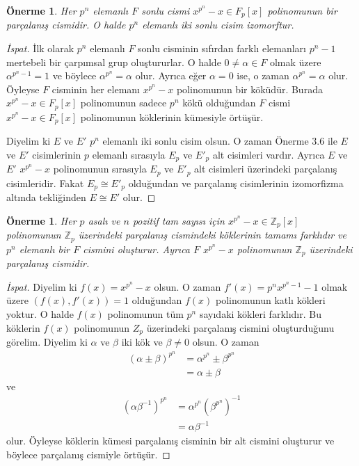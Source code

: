 \documentclass[draft]{article}
\newtheorem{prop}[thm]{Önerme}
\theoremstyle{definition}
\theoremstyle{remark}
\begin{document}
    	    \begin{prop}
    	        Her $p^n$ elemanlı $F$ sonlu cismi $x^{p^n} - x \in F_p[x]$ polinomunun bir parçalanış cismidir. O halde $p^n$ elemanlı iki sonlu cisim izomorftur.
    	    \end{prop}
    	    
    	    \begin{proof}[İspat]
    	        İlk olarak $p^n$ elemanlı $F$ sonlu cisminin sıfırdan farklı elemanları $p^n - 1$ mertebeli bir çarpımsal grup oluştururlar. O halde $0 \neq \alpha \in F$ olmak üzere $\alpha^{p^n - 1} = 1$ ve böylece $\alpha^{p^n} = \alpha$ olur. Ayrıca eğer $\alpha = 0$ ise, o zaman $\alpha^{p^n} = \alpha$ olur. Öyleyse $F$ cisminin her elemanı $x^{p^n} - x$ polinomunun bir köküdür. Burada $x^{p^n} - x \in F_p[x]$ polinomunun sadece $p^n$ kökü olduğundan $F$ cismi $x^{p^n} - x \in F_p[x]$ polinomunun köklerinin kümesiyle örtüşür.\par
    	        Diyelim ki $E$ ve $E'$ $p^n$ elemanlı iki sonlu cisim olsun. O zaman Önerme 3.6 ile $E$ ve $E'$ cisimlerinin $p$ elemanlı sırasıyla $E_p$ ve $E'_p$ alt cisimleri vardır. Ayrıca $E$ ve $E'$ $x^{p^n} - x$ polinomunun sırasıyla $E_p$ ve $E'_p$ alt cisimleri üzerindeki parçalanış cisimleridir. Fakat $E_p \cong E'_p$ olduğundan ve parçalanış cisimlerinin izomorfizma altında tekliğinden $E \cong E'$ olur.
    	    \end{proof}
    	    
    	    \begin{prop}
    	        Her $p$ asalı ve $n$ pozitif tam sayısı için $x^{p^n} - x \in \mathbb{Z}_p[x]$ polinomunun $\mathbb{Z}_p$ üzerindeki parçalanış cismindeki köklerinin tamamı farklıdır ve $p^n$ elemanlı bir $F$ cismini oluşturur. Ayrıca $F$ $x^{p^n} - x$ polinomunun $\mathbb{Z}_p$ üzerindeki parçalanış cismidir.
    	    \end{prop}
    	    
    	    \begin{proof}[İspat]
    	        Diyelim ki $f(x) = x^{p^n} - x$ olsun. O zaman $f'(x) = p^n x^{p^n - 1} - 1$ olmak üzere $(f(x), f'(x)) = 1$ olduğundan $f(x)$ polinomunun katlı kökleri yoktur. O halde $f(x)$ polinomunun tüm $p^n$ sayıdaki kökleri farklıdır. Bu köklerin $f(x)$ polinomunun $Z_p$ üzerindeki parçalanış cismini oluşturduğunu görelim. Diyelim ki $\alpha$ ve $\beta$ iki kök ve $\beta \neq 0$ olsun. O zaman
    	        \begin{align*}
    	            (\alpha \pm \beta)^{p^n} &= \alpha^{p^n} \pm \beta^{p^n}\\
    	            &= \alpha \pm \beta
    	        \end{align*}
    	        ve
    	        \begin{align*}
    	            (\alpha \beta^{-1})^{p^n} &= \alpha^{p^n} (\beta^{p^n})^{-1}\\
    	            &= \alpha \beta^{-1}
    	        \end{align*}
    	        olur. Öyleyse köklerin kümesi parçalanış cisminin bir alt cismini oluşturur ve böylece parçalanış cismiyle örtüşür.
    	    \end{proof}
    	    
\end{document}
